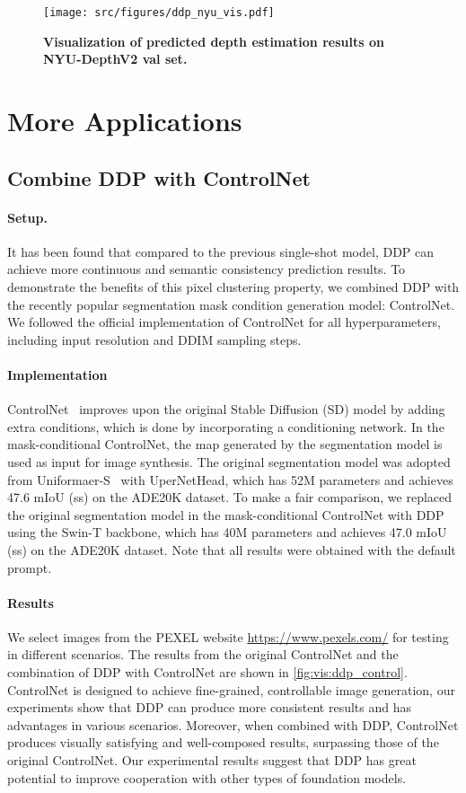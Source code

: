 \documentclass[10pt,twocolumn,letterpaper]{article}
\begin{document}
\newpage
\begin{figure*}[h]
    \centering
    \texttt{[image: src/figures/ddp\_nyu\_vis.pdf]}
    \caption{\textbf{Visualization of predicted depth estimation results on NYU-DepthV2 val set.}
     }
    \label{fig:vis:nyu}
\end{figure*}

\newpage

\section{More Applications}
\subsection{Combine DDP with ControlNet}
\paragraph{Setup.}
It has been found that compared to the previous single-shot model, DDP can achieve more continuous and semantic consistency prediction results. To demonstrate the benefits of this pixel clustering property, we combined DDP with the recently popular segmentation mask condition generation model: ControlNet. We followed the official implementation of ControlNet for all hyperparameters, including input resolution and DDIM sampling steps.


\paragraph{Implementation}
ControlNet~\cite{zhang2023adding} improves upon the original Stable Diffusion (SD) model by adding extra conditions, which is done by incorporating a conditioning network.
In the mask-conditional ControlNet, the map generated by the segmentation model is used as input for image synthesis.
The original segmentation model was adopted from Uniformaer-S~\cite{li2022uniformer} with UperNetHead, which has 52M parameters and achieves 47.6 mIoU (ss) on the ADE20K dataset.
To make a fair comparison, we replaced the original segmentation model in the mask-conditional ControlNet with DDP using the Swin-T backbone, which has 40M parameters and achieves 47.0 mIoU (ss) on the ADE20K dataset.
Note that all results were obtained with the default prompt.

\paragraph{Results}
We select images from the PEXEL website \url{https://www.pexels.com/} for testing in different scenarios.
The results from the original ControlNet and the combination of DDP with ControlNet are shown in \cref{fig:vis:ddp_control}.
ControlNet is designed to achieve fine-grained, controllable image generation, our experiments show that DDP can produce more consistent results and has advantages in various scenarios. Moreover, when combined with DDP, ControlNet produces visually satisfying and well-composed results, surpassing those of the original ControlNet.
Our experimental results suggest that DDP has great potential to improve cooperation with other types of foundation models.
\end{document}

